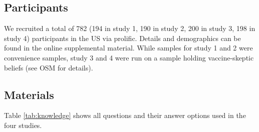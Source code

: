 \documentclass[
  doc,floatsintext]{apa6}
\begin{document}
\subsection{Participants}\label{participants}

We recruited a total of 782 (194 in study 1, 190 in study 2, 200 in study 3, 198 in study 4) participants in the US via prolific. Details and demographics can be found in the online supplemental material. While samples for study 1 and 2 were convenience samples, study 3 and 4 were run on a sample holding vaccine-skeptic beliefs (see OSM for details).

\subsection{Materials}\label{materials}

Table \ref{tab:knowledge} shows all questions and their answer options used in the four studies.

\begingroup\fontsize{8}{10}\selectfont
\end{document}
